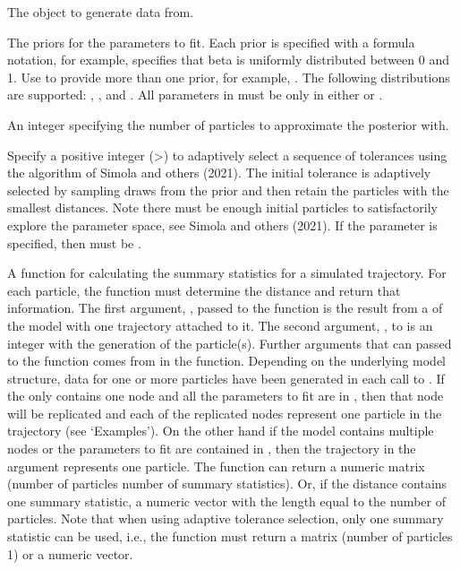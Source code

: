 \documentclass[letterpaper]{book}
\begin{document}
\begin{Arguments}
\begin{ldescription}
\item[\code{model}] The  object to generate data from.

\item[\code{priors}] The priors for the parameters to fit. Each prior is
specified with a formula notation, for example,  specifies that beta is uniformly distributed
between 0 and 1. Use  to provide more than one
prior, for example, . The following distributions are supported:
, ,  and
. All parameters in  must be only
in either  or .

\item[\code{n\_particles}] An integer  specifying the number of
particles to approximate the posterior with.

\item[\code{n\_init}] Specify a positive integer (>) to
adaptively select a sequence of tolerances using the algorithm
of Simola and others (2021). The initial tolerance is
adaptively selected by sampling  draws from the
prior and then retain the  particles with
the smallest distances. Note there must be enough initial
particles to satisfactorily explore the parameter space, see
Simola and others (2021). If the  parameter is
specified, then  must be .

\item[\code{distance}] A function for calculating the summary statistics
for a simulated trajectory. For each particle, the function
must determine the distance and return that information. The
first argument, , passed to the 
function is the result from a  of the model with one
trajectory attached to it. The second argument,
, to  is an integer with the
generation of the particle(s). Further arguments that can
passed to the  function comes from 
in the  function. Depending on the underlying model
structure, data for one or more particles have been generated
in each call to . If the  only
contains one node and all the parameters to fit are in
, then that node will be replicated and each of
the replicated nodes represent one particle in the trajectory
(see `Examples'). On the other hand if the model
contains multiple nodes or the parameters to fit are contained
in , then the trajectory in the 
argument represents one particle. The function can return a
numeric matrix (number of particles \eqn{\times}{} number of
summary statistics). Or, if the distance contains one summary
statistic, a numeric vector with the length equal to the
number of particles. Note that when using adaptive tolerance
selection, only one summary statistic can be used, i.e., the
function must return a matrix (number of particles
\eqn{\times}{} 1) or a numeric vector.


\end{ldescription}
\end{Arguments}
\end{document}
